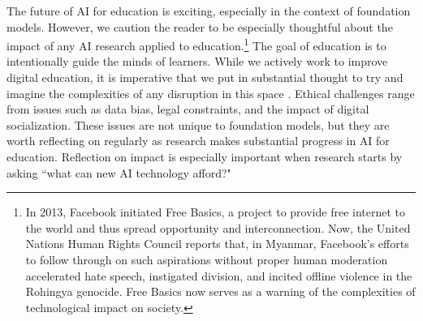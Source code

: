 The future of AI for education is exciting, especially in the context of foundation models. However, we caution the reader to be especially thoughtful about the impact of any AI research applied to education.\footnote{In 2013, Facebook initiated Free Basics, a project to provide free internet to the world and thus spread opportunity and interconnection. Now, the United Nations Human Rights Council reports that, in Myanmar, Facebook’s efforts to follow through on such aspirations without proper human moderation accelerated hate speech, instigated division, and incited offline violence in the Rohingya genocide. Free Basics now serves as a warning of the complexities of technological impact on society.} 
The goal of education is to intentionally guide the minds of learners. While we actively work to improve digital education, it is imperative that we put in substantial thought to try and imagine the complexities of any disruption in this space \cite{einsteinVision}. Ethical challenges range from issues such as data bias, legal constraints, and the impact of digital socialization. These issues are not unique to foundation models, but they are worth reflecting on regularly as research makes substantial progress in AI for education. Reflection on impact is especially important when research starts by asking ``what can new AI technology afford?" 


